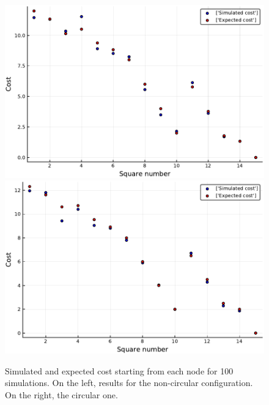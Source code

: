 \begin{figure}[H]
\centering
\includegraphics[scale=0.41]{../img/board_right_high/cost_per_square_100_iter_noncirc.pdf}
\includegraphics[scale=0.41]{../img/board_right_high/cost_per_square_100_iter_circ.pdf}
\caption{Simulated and expected cost starting from each node for 100 simulations. On the left, results for the non-circular configuration. On the right, the circular one.}
\label{fig:cost_per_square_100_iter_right}
\end{figure}

